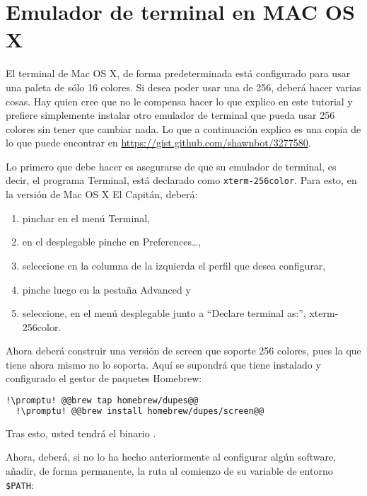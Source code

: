 \section{Emulador de terminal en MAC OS X}\label{sec:terminal-m}
El terminal de Mac OS X, de forma predeterminada está configurado para usar una paleta de sólo 16 colores. Si
desea poder usar una de 256, deberá hacer varias cosas. Hay quien cree que no le compensa hacer lo que explico
en este tutorial y prefiere simplemente instalar otro emulador de terminal que pueda usar 256 colores sin tener
que cambiar nada. Lo que a continuación explico es una copia de lo que puede encontrar en
\url{https://gist.github.com/shawnbot/3277580}.

Lo primero que debe hacer es asegurarse de que su emulador de terminal, es decir, el programa Terminal, está
declarado como \lstinline!xterm-256color!. Para esto, en la versión de Mac OS X El Capitán, deberá:

\begin{enumerate}
  \item pinchar en el menú Terminal,
  \item en el desplegable pinche en Preferences\ldots,
  \item seleccione en la columna de la izquierda el perfil que desea configurar,
  \item pinche luego en la pestaña Advanced y
  \item seleccione, en el menú desplegable junto a ``Declare terminal as:'', xterm-256color.
\end{enumerate}

Ahora deberá construir una versión de screen que soporte 256 colores, pues la que tiene ahora mismo no lo
soporta. Aquí se supondrá que tiene instalado y configurado el gestor de paquetes Homebrew:

\begin{lstlisting}[gobble=2,language=bash,style=bashinteract,escapechar=!]
  !\promptu! @@brew tap homebrew/dupes@@
  !\promptu! @@brew install homebrew/dupes/screen@@
\end{lstlisting}

Tras esto, usted tendrá el binario .

Ahora, deberá, si no lo ha hecho anteriormente al configurar algún software, añadir, de forma permanente, la
ruta al comienzo de su variable de entorno \lstinline!$PATH!:

